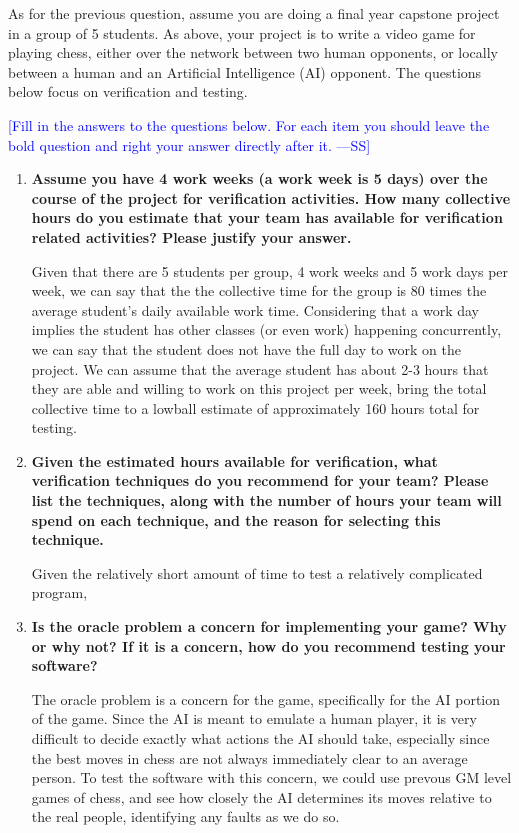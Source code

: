 \documentclass[12pt,fleqn]{examtst}
\newcommand{\authornote}[3]{\textcolor{#1}{[#3 ---#2]}}
\newcommand{\authornote}[3]{}
\newcommand{\wss}[1]{\authornote{blue}{SS}{#1}}
\begin{document}

\newpage

 As for the previous question, assume you are doing a final
year capstone project in a group of 5 students.  As above, your project
is to write a video game for playing chess, either over the network between two
human opponents, or locally between a human and an Artificial Intelligence
(AI) opponent.  The questions below focus on verification and testing.

\bigskip

\noindent \wss{Fill in the answers to the questions below.  For each item you
  should leave the bold question and right your answer directly after it.}

\begin{enumerate}
\item \textbf{Assume you have 4 work weeks (a work week is 5 days) over the
    course of the project for verification activities.  How many collective
    hours do you estimate that your team has available for verification related
    activities?  Please justify your answer.}

Given that there are 5 students per group, 4 work weeks and 5 work days per week, we can say that the the collective time for the group is 80 times the average student's daily available work time. Considering that a work day implies the student has other classes (or even work) happening concurrently, we can say that the student does not have the full day to work on the project. We can assume that the average student has about 2-3 hours that they are able and willing to work on this project per week, bring the total collective time to a lowball estimate of approximately 160 hours total for testing. 
  
\item \textbf{Given the estimated hours available for verification, what verification
    techniques do you recommend for your team?  Please list the techniques,
    along with the number of hours your team will spend on each technique, and
    the reason for selecting this technique.}

Given the relatively short amount of time to test a relatively complicated program,
  
\item \textbf{Is the oracle problem a concern for implementing your game?  Why
    or why not?  If it is a concern, how do you recommend testing your software?}

The oracle problem is a concern for the game, specifically for the AI portion of the game. Since the AI is meant to emulate a human player, it is very difficult to decide exactly what actions the AI should take, especially since the best moves in chess are not always immediately clear to an average person. To test the software with this concern, we could use prevous GM level games of chess, and see how closely the AI determines its moves relative to the real people, identifying any faults as we do so.
    
\end{enumerate}
\end{document}
